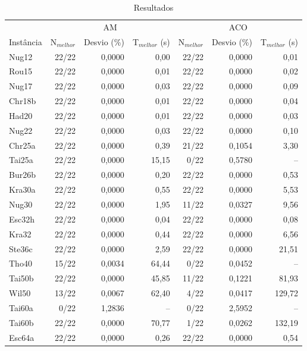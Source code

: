 \begin{table}[H]
  \caption{Resultados \label{resultados}}
  \centering
  \begin{tabular}{l r r r r r r}
    \toprule
    & \multicolumn{3}{c}{AM} & \multicolumn{3}{c}{ACO} \\
    \cmidrule(r){2-4} \cmidrule(r){5-7}
    Instância & N$_{melhor}$ & Desvio (\%) & T$_{melhor}$ (s) & N$_{melhor}$
    & Desvio (\%) & T$_{melhor}$ (s)\\
    \midrule
    Nug12 & 22/22 & 0,0000 & 0,00 & 22/22 & 0,0000 & 0,01 \\
    Rou15 & 22/22 & 0,0000 & 0,01 & 22/22 & 0,0000 & 0,02 \\
    Nug17 & 22/22 & 0,0000 & 0,03 & 22/22 & 0,0000 & 0,09 \\
    Chr18b & 22/22 & 0,0000 & 0,01 & 22/22 & 0,0000 & 0,04 \\
    Had20 & 22/22 & 0,0000 & 0,01 & 22/22 & 0,0000 & 0,03 \\
    Nug22 & 22/22 & 0,0000 & 0,03 & 22/22 & 0,0000 & 0,10 \\
    Chr25a & 22/22 & 0,0000 & 0,39 & 21/22 & 0,1054 & 3,30 \\
    Tai25a & 22/22 & 0,0000 & 15,15 & 0/22 & 0,5780 & -- \\
    Bur26b & 22/22 & 0,0000 & 0,20 & 22/22 & 0,0000 & 0,53 \\
    Kra30a & 22/22 & 0,0000 & 0,55 & 22/22 & 0,0000 & 5,53 \\
    Nug30 & 22/22 & 0,0000 & 1,95 & 11/22 & 0,0327 & 9,56 \\
    Esc32h & 22/22 & 0,0000 & 0,04 & 22/22 & 0,0000 & 0,08 \\
    Kra32 & 22/22 & 0,0000 & 0,44 & 22/22 & 0,0000 & 6,56 \\
    Ste36c & 22/22 & 0,0000 & 2,59 & 22/22 & 0,0000 & 21,51 \\
    Tho40 & 15/22 & 0,0034 & 64,44 & 0/22 & 0,0452 & -- \\
    Tai50b & 22/22 & 0,0000 & 45,85 & 11/22 & 0,1221 & 81,93 \\
    Wil50 & 13/22 & 0,0067 & 62,40 & 4/22 & 0,0417 & 129,72 \\
    Tai60a & 0/22 & 1,2836 & -- & 0/22 & 2,5952 & -- \\
    Tai60b & 22/22 & 0,0000 & 70,77 & 1/22 & 0,0262 & 132,19 \\
    Esc64a & 22/22 & 0,0000 & 0,26 & 22/22 & 0,0000 & 0,54 \\
    \bottomrule
  \end{tabular}
\end{table}


